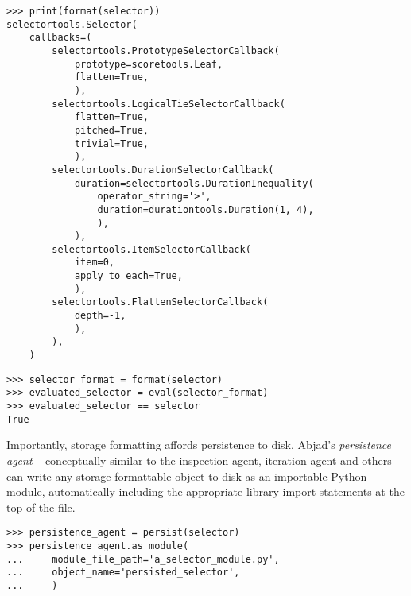 \begin{comment}
<abjad>
print(format(selector))
selector_format = format(selector)
evaluated_selector = eval(selector_format)
evaluated_selector == selector
</abjad>
\end{comment}

\begin{abjadbookoutput}
\begin{singlespacing}
\vspace{-0.5\baselineskip}
\begin{verbatim}
>>> print(format(selector))
selectortools.Selector(
    callbacks=(
        selectortools.PrototypeSelectorCallback(
            prototype=scoretools.Leaf,
            flatten=True,
            ),
        selectortools.LogicalTieSelectorCallback(
            flatten=True,
            pitched=True,
            trivial=True,
            ),
        selectortools.DurationSelectorCallback(
            duration=selectortools.DurationInequality(
                operator_string='>',
                duration=durationtools.Duration(1, 4),
                ),
            ),
        selectortools.ItemSelectorCallback(
            item=0,
            apply_to_each=True,
            ),
        selectortools.FlattenSelectorCallback(
            depth=-1,
            ),
        ),
    )
\end{verbatim}
\begin{verbatim}
>>> selector_format = format(selector)
>>> evaluated_selector = eval(selector_format)
>>> evaluated_selector == selector
True
\end{verbatim}
\end{singlespacing}
\end{abjadbookoutput}

\noindent Importantly, storage formatting affords persistence to disk. Abjad's
\emph{persistence agent} -- conceptually similar to the inspection agent,
iteration agent and others -- can write any storage-formattable object to disk
as an importable Python module, automatically including the appropriate library
import statements at the top of the file.

\begin{comment}
<abjad>
persistence_agent = persist(selector)
persistence_agent.as_module(
    module_file_path='a_selector_module.py',
    object_name='persisted_selector',
    )
</abjad>
\end{comment}

\begin{abjadbookoutput}
\begin{singlespacing}
\vspace{-0.5\baselineskip}
\begin{verbatim}
>>> persistence_agent = persist(selector)
>>> persistence_agent.as_module(
...     module_file_path='a_selector_module.py',
...     object_name='persisted_selector',
...     )
\end{verbatim}
\end{singlespacing}
\end{abjadbookoutput}

